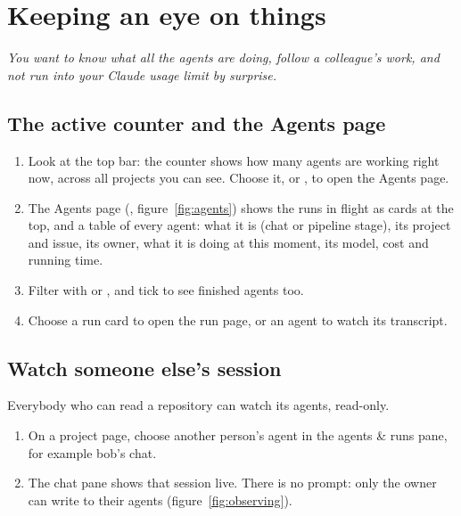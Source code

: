 \chapter{Keeping an eye on things}\label{ch:watch}

\emph{You want to know what all the agents are doing, follow a colleague's work, and not run into
your Claude usage limit by surprise.}

\section{The active counter and the Agents page}\label{sec:agents-page}

\begin{enumerate}
  \item Look at the top bar: the counter  shows how many agents are working right now,
    across all projects you can see. Choose it, or , to open the Agents page.
  \item The Agents page (, figure~\ref{fig:agents}) shows the runs in flight as
    cards at the top, and a table of every agent: what it is (chat or pipeline stage), its project
    and issue, its owner, what it is doing at this moment, its model, cost and running time.
  \item Filter with  or , and tick  to see finished agents too.
  \item Choose a run card to open the run page, or an agent to watch its transcript.
\end{enumerate}


\section{Watch someone else's session}\label{sec:observe}

Everybody who can read a repository can watch its agents, read-only.

\begin{enumerate}
  \item On a project page, choose another person's agent in the agents \& runs pane, for example
    bob's chat.
  \item The chat pane shows that session live. There is no prompt: only
    the owner can write to their agents (figure~\ref{fig:observing}).
\end{enumerate}

